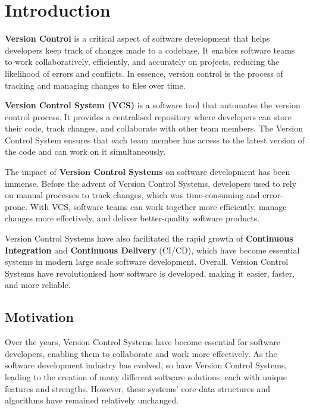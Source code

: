 \chapter{Introduction}
\label{chap:intro}
\textbf{Version Control} is a critical aspect of software development that helps developers keep track of changes made to a codebase. It enables software teams to work collaboratively, efficiently, and accurately on projects, reducing the likelihood of errors and conflicts. In essence, version control is the process of tracking and managing changes to files over time.
\vspace{9pt}

\textbf{Version Control System (VCS)} is a software tool that automates the version control process. It provides a centralised repository where developers can store their code, track changes, and collaborate with other team members. The Version Control System ensures that each team member has access to the latest version of the code and can work on it simultaneously.
\vspace{9pt}

The impact of \textbf{Version Control Systems} on software development has been immense. Before the advent of Version Control Systems, developers used to rely on manual processes to track changes, which was time-consuming and error-prone. With VCS, software teams can work together more efficiently, manage changes more effectively, and deliver better-quality software products.
\vspace{9pt}

Version Control Systems have also facilitated the rapid growth of \textbf{Continuous Integration} and \textbf{Continuous Delivery} (CI/CD), which have become essential systems in modern large scale software development. Overall, Version Control Systems have revolutionised how software is developed, making it easier, faster, and more reliable.

\section{Motivation}
Over the years, Version Control Systems have become essential for software developers, enabling them to collaborate and work more effectively. As the software development industry has evolved, so have Version Control Systems, leading to the creation of many different software solutions, each with unique features and strengths. However, these systems' core data structures and algorithms have remained relatively unchanged.
\vspace{9pt}

